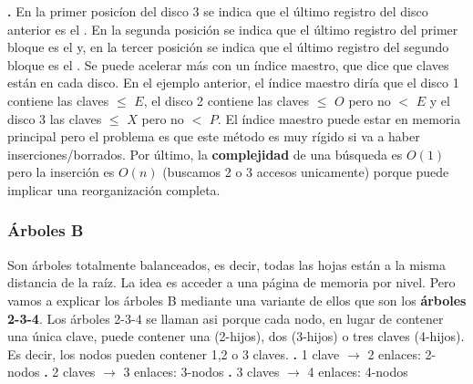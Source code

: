 \documentclass[10pt,a4paper]{article}
\begin{document}
\newline
\textbf{.} En la primer posicíon del disco 3 se indica que el último registro del disco anterior es el . En la segunda posición se indica que el último registro del primer bloque es el  y, en la tercer posición se indica que el último registro del segundo bloque es el .
\newline
\newline
Se puede acelerar más con un índice maestro, que dice que claves están en cada disco. En el ejemplo anterior, el índice maestro diría que el disco 1 contiene las claves $\leq$ $E$, el disco 2 contiene las claves $\leq$ $O$ pero no $<$ $E$ y el disco 3 las claves $\leq$ $X$ pero no $<$ $P$. 
\newline
\newline
El índice maestro puede estar en memoria principal pero el problema es que este método es muy rígido si va a haber inserciones/borrados.
\newline
\newline
Por último, la \textbf{complejidad} de una búsqueda es $O(1)$ pero la inserción es $O(n)$ (buscamos 2 o 3 accesos unicamente) porque puede implicar una reorganización completa.

\subsubsection{Árboles B}

Son árboles totalmente balanceados, es decir, todas las hojas están a la misma distancia de la raíz.
\newline
\newline
La idea es acceder a una página de memoria por nivel.
\newline
\newline
Pero vamos a explicar los árboles B mediante una variante de ellos que son los \textbf{árboles 2-3-4}.
\newline
\newline
Los árboles 2-3-4 se llaman asi porque cada nodo, en lugar de contener una única clave, puede contener una (2-hijos), dos (3-hijos) o tres claves (4-hijos). 
\newline
\newline
Es decir, los nodos pueden contener 1,2 o 3 claves.
\newline
\newline
\textbf{.} 1 clave $\rightarrow$ 2 enlaces: 2-nodos 
\newline
\newline
\textbf{.} 2 claves $\rightarrow$ 3 enlaces: 3-nodos
\newline
\newline
\textbf{.} 3 claves $\rightarrow$ 4 enlaces: 4-nodos
\newpage
\end{document}
